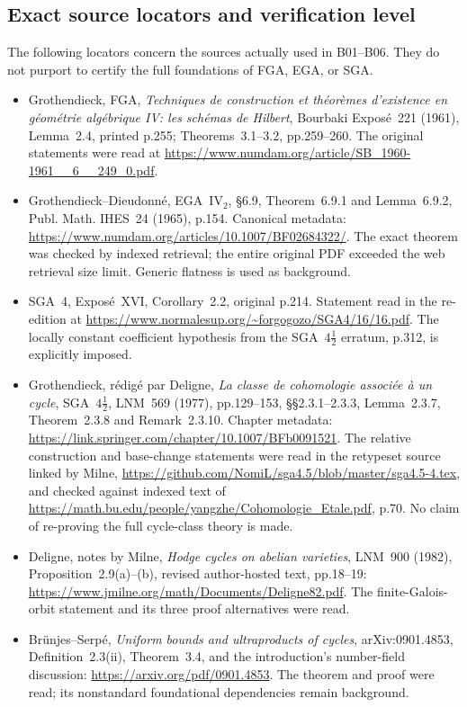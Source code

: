 \subsection{Exact source locators and verification level}
The following locators concern the sources actually used in B01--B06.
They do not purport to certify the full foundations of FGA, EGA, or SGA.
\begin{itemize}
\item Grothendieck, FGA, \emph{Techniques de construction et th\'eor\`emes
d'existence en g\'eom\'etrie alg\'ebrique IV: les sch\'emas de Hilbert},
Bourbaki Expos\'e~221 (1961), Lemma~2.4, printed p.255; Theorems~3.1--3.2,
pp.259--260. The original statements were read at
\url{https://www.numdam.org/article/SB_1960-1961__6__249_0.pdf}.
\item Grothendieck--Dieudonn\'e, EGA~IV$_2$, \S6.9, Theorem~6.9.1 and
Lemma~6.9.2, Publ. Math. IHES~24 (1965), p.154. Canonical metadata:
\url{https://www.numdam.org/articles/10.1007/BF02684322/}.
The exact theorem was checked by indexed retrieval; the entire original
PDF exceeded the web retrieval size limit. Generic flatness is used as
background.
\item SGA~4, Expos\'e~XVI, Corollary~2.2, original p.214. Statement read in
the re-edition at \url{https://www.normalesup.org/~forgogozo/SGA4/16/16.pdf}.
The locally constant coefficient hypothesis from the SGA~$4\frac12$
erratum, p.312, is explicitly imposed.
\item Grothendieck, r\'edig\'e par Deligne, \emph{La classe de cohomologie
associ\'ee \`a un cycle}, SGA~$4\frac12$, LNM~569 (1977), pp.129--153,
\S\S2.3.1--2.3.3, Lemma~2.3.7, Theorem~2.3.8 and Remark~2.3.10.
Chapter metadata: \url{https://link.springer.com/chapter/10.1007/BFb0091521}.
The relative construction and base-change statements were read in the
retypeset source linked by Milne,
\url{https://github.com/NomiL/sga4.5/blob/master/sga4.5-4.tex}, and checked
against indexed text of
\url{https://math.bu.edu/people/yangzhe/Cohomologie_Etale.pdf}, p.70.
No claim of re-proving the full cycle-class theory is made.
\item Deligne, notes by Milne, \emph{Hodge cycles on abelian varieties},
LNM~900 (1982), Proposition~2.9(a)--(b), revised author-hosted text,
pp.18--19: \url{https://www.jmilne.org/math/Documents/Deligne82.pdf}.
The finite-Galois-orbit statement and its three proof alternatives were
read.
\item Br\"unjes--Serp\'e, \emph{Uniform bounds and ultraproducts of cycles},
arXiv:0901.4853, Definition~2.3(ii), Theorem~3.4, and the introduction's
number-field discussion: \url{https://arxiv.org/pdf/0901.4853}. The theorem
and proof were read; its nonstandard foundational dependencies remain
background.
\end{itemize}
